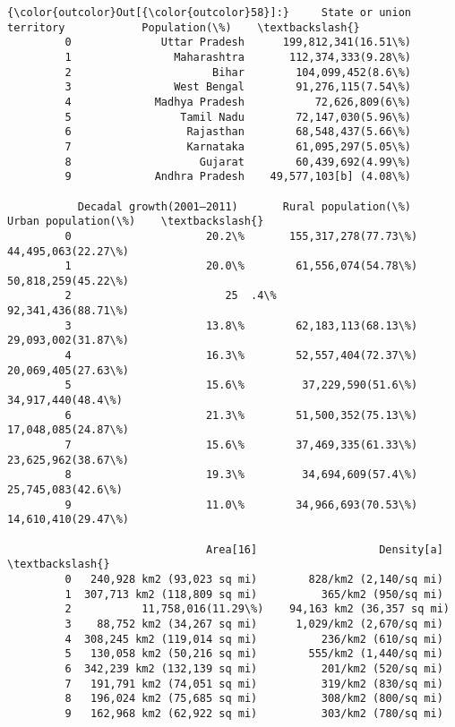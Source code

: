 \documentclass[11pt]{article}
\begin{document}
\begin{Verbatim}[commandchars=\\\{\}]
{\color{outcolor}Out[{\color{outcolor}58}]:}     State or union territory            Population(\%)    \textbackslash{}
         0              Uttar Pradesh      199,812,341(16.51\%)     
         1                Maharashtra       112,374,333(9.28\%)     
         2                      Bihar        104,099,452(8.6\%)     
         3                West Bengal        91,276,115(7.54\%)     
         4             Madhya Pradesh           72,626,809(6\%)     
         5                 Tamil Nadu        72,147,030(5.96\%)     
         6                  Rajasthan        68,548,437(5.66\%)     
         7                  Karnataka        61,095,297(5.05\%)     
         8                    Gujarat        60,439,692(4.99\%)     
         9             Andhra Pradesh    49,577,103[b] (4.08\%)     
         
           Decadal growth(2001–2011)       Rural population(\%)   Urban population(\%)    \textbackslash{}
         0                     20.2\%       155,317,278(77.73\%)    44,495,063(22.27\%)     
         1                     20.0\%        61,556,074(54.78\%)    50,818,259(45.22\%)     
         2                        25  .4\%                         92,341,436(88.71\%)     
         3                     13.8\%        62,183,113(68.13\%)    29,093,002(31.87\%)     
         4                     16.3\%        52,557,404(72.37\%)    20,069,405(27.63\%)     
         5                     15.6\%         37,229,590(51.6\%)     34,917,440(48.4\%)     
         6                     21.3\%        51,500,352(75.13\%)    17,048,085(24.87\%)     
         7                     15.6\%        37,469,335(61.33\%)    23,625,962(38.67\%)     
         8                     19.3\%         34,694,609(57.4\%)     25,745,083(42.6\%)     
         9                     11.0\%        34,966,693(70.53\%)    14,610,410(29.47\%)     
         
                               Area[16]                   Density[a]    \textbackslash{}
         0   240,928 km2 (93,023 sq mi)        828/km2 (2,140/sq mi)     
         1  307,713 km2 (118,809 sq mi)          365/km2 (950/sq mi)     
         2           11,758,016(11.29\%)    94,163 km2 (36,357 sq mi)     
         3    88,752 km2 (34,267 sq mi)      1,029/km2 (2,670/sq mi)     
         4  308,245 km2 (119,014 sq mi)          236/km2 (610/sq mi)     
         5   130,058 km2 (50,216 sq mi)        555/km2 (1,440/sq mi)     
         6  342,239 km2 (132,139 sq mi)          201/km2 (520/sq mi)     
         7   191,791 km2 (74,051 sq mi)          319/km2 (830/sq mi)     
         8   196,024 km2 (75,685 sq mi)          308/km2 (800/sq mi)     
         9   162,968 km2 (62,922 sq mi)          303/km2 (780/sq mi)     
         

\end{Verbatim}
\end{document}
